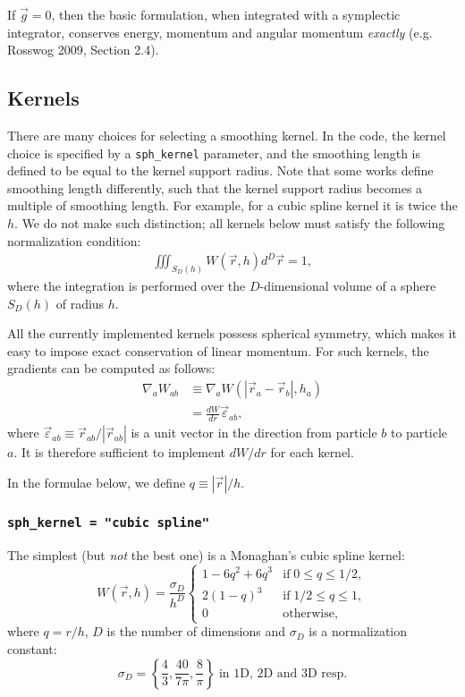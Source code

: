 \documentclass{article}
\begin{document}
If $\vec{g}=0$, then the basic formulation, when integrated with a symplectic
integrator, conserves energy, momentum and angular momentum \emph{exactly}
(e.g. Rosswog 2009, Section 2.4).


\subsection{Kernels}
\label{sec:kernels}
There are many choices for selecting a smoothing kernel. In the code, the
kernel choice is specified by a {\tt sph\_kernel} parameter, and the smoothing
length is defined to be equal to the kernel support radius. Note that some
works define smoothing length differently, such that the kernel support radius
becomes a multiple of smoothing length. For example, for a cubic spline kernel
it is twice the $h$. We do not make such distinction; all kernels below must
satisfy the following normalization condition:
\begin{align}
  \iiint_{S_D(h)} W(\vec{r},h) d^D\vec{r} = 1,
\label{eq:kernel_normalization_condition}
\end{align}
where the integration is performed over the $D$-dimensional volume of a sphere
$S_D(h)$ of radius $h$.

All the currently implemented kernels possess spherical symmetry, which makes
it easy to impose exact conservation of linear momentum. For such kernels, the
gradients can be computed as follows:
\begin{align}
  \nabla_a W_{ab} &\equiv \nabla_a W(|\vec{r}_a - \vec{r}_b|, h_a) \\
                  &= \frac{dW}{dr} \vec{\varepsilon}_{ab},
\end{align}
where $\vec{\varepsilon}_{ab}\equiv\vec{r}_{ab}/|\vec{r}_{ab}|$ is a unit
vector in the direction from particle $b$ to particle $a$.
It is therefore sufficient to implement $dW/dr$ for each kernel.

In the formulae below, we define $q\equiv|\vec{r}|/h$.

\subsubsection{{\tt sph\_kernel = "cubic spline"}}
The simplest (but \emph{not} the best one) is a Monaghan's cubic spline kernel:
\begin{equation}
W(\vec{r},h) = \frac{\sigma_D}{h^D} 
  \begin{cases}
    1 - 6 q^2 + 6 q^3 & \text{if} \; 0 \leq q \leq 1/2, \\
    2(1 - q)^3        & \text{if} \; 1/2 \leq q \leq 1, \\
    0                 & \text{otherwise},
\end{cases}
\end{equation}
where $q = r/h$, $D$ is the number of dimensions and 
$\sigma_D$ is a normalization constant:
\begin{equation}
\sigma_D =  \left\{ \frac43, \frac{40}{7\pi},\frac8{\pi}\right\}
         \; \text{in 1D, 2D and 3D resp.}
\end{equation}
\end{document}
